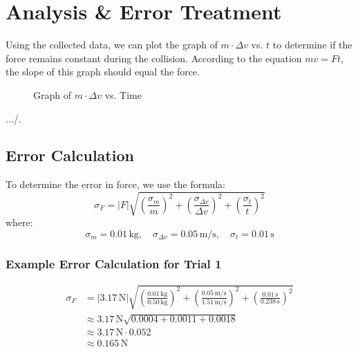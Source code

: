 \documentclass[12pt]{article}
\begin{document}
\section{Analysis \& Error Treatment}

Using the collected data, we can plot the graph of $m \cdot \Delta v$ vs. $t$ to determine if the force remains constant during the collision. According to the equation $mv = Ft$, the slope of this graph should equal the force.

\begin{figure}[H]
    \centering
    \caption{Graph of $m \cdot \Delta v$ vs. Time}
    \label{fig:momentum_vs_time}
\end{figure}.../.   
\subsection{Error Calculation}
To determine the error in force, we use the formula:
\[
\sigma_F = \left| F \right| \sqrt{\left( \frac{\sigma_m}{m} \right)^2 + \left( \frac{\sigma_{\Delta v}}{\Delta v} \right)^2 + \left( \frac{\sigma_t}{t} \right)^2}
\]
where:
\[
\sigma_m = 0.01 \, \text{kg}, \quad \sigma_{\Delta v} = 0.05 \, \text{m/s}, \quad \sigma_t = 0.01 \, \text{s}
\]

\subsubsection{Example Error Calculation for Trial 1}
\begin{align*}
\sigma_F &= \left| 3.17 \, \text{N} \right| \sqrt{\left( \frac{0.01 \, \text{kg}}{0.50 \, \text{kg}} \right)^2 + \left( \frac{0.05 \, \text{m/s}}{1.51 \, \text{m/s}} \right)^2 + \left( \frac{0.01 \, \text{s}}{0.238 \, \text{s}} \right)^2} \\
&\approx 3.17 \, \text{N} \sqrt{0.0004 + 0.0011 + 0.0018} \\
&\approx 3.17 \, \text{N} \cdot 0.052 \\
&\approx 0.165 \, \text{N}
\end{align*}
\end{document}
